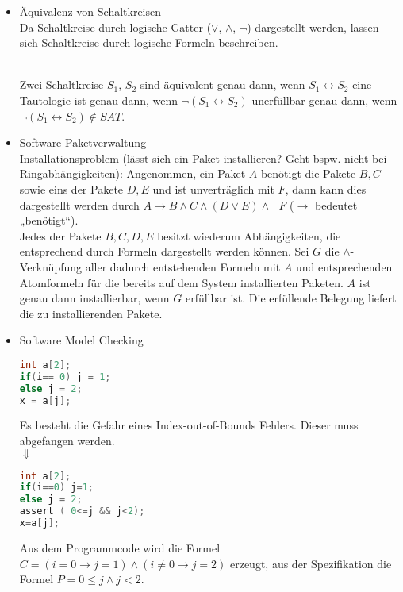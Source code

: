 \begin{itemize}
\item Äquivalenz von Schaltkreisen\\
Da Schaltkreise durch logische Gatter ($\vee$, $\wedge$, $\neg$) dargestellt werden, lassen sich Schaltkreise durch logische Formeln beschreiben.\\
\\
Zwei Schaltkreise $S_1$, $S_2$ sind äquivalent genau dann, wenn $S_1\leftrightarrow S_2$ eine Tautologie ist genau dann, wenn $\neg(S_1 \leftrightarrow S_2)$ unerfüllbar genau dann, wenn $\neg (S_1\leftrightarrow S_2) \not \in SAT$.
\item Software-Paketverwaltung\\
Installationsproblem (lässt sich ein Paket installieren? Geht bspw. nicht bei Ringabhängigkeiten): Angenommen, ein Paket $A$ benötigt die Pakete $B,C$ sowie eins der Pakete $D,E$ und ist unverträglich mit $F$, dann kann dies dargestellt werden durch $A \to B \wedge C \wedge (D \vee E) \wedge \neg F$ ($\to$ bedeutet „benötigt“).\\
Jedes der Pakete $B,C,D,E$ besitzt wiederum Abhängigkeiten, die entsprechend durch Formeln dargestellt werden können. Sei $G$ die $\wedge$-Verknüpfung aller dadurch entstehenden Formeln mit $A$ und entsprechenden Atomformeln für die bereits auf dem System installierten Paketen. $A$ ist genau dann installierbar, wenn $G$ erfüllbar ist. Die erfüllende Belegung liefert die zu installierenden Pakete.
\item Software Model Checking
\begin{lstlisting}[language=C]
int a[2];
if(i== 0) j = 1;
else j = 2;
x = a[j];
\end{lstlisting}
Es besteht die Gefahr eines Index-out-of-Bounds Fehlers. Dieser muss abgefangen werden.\\
$\Downarrow$
\begin{lstlisting}[language=C]
int a[2];
if(i==0) j=1;
else j = 2;
assert ( 0<=j && j<2);
x=a[j];
\end{lstlisting}
Aus dem Programmcode wird die Formel $C=(i=0 \to j=1)\wedge ( i \not = 0 \to j = 2)$ erzeugt, aus der Spezifikation die Formel $P=0\leq j \wedge j <2$.
\end{itemize}


